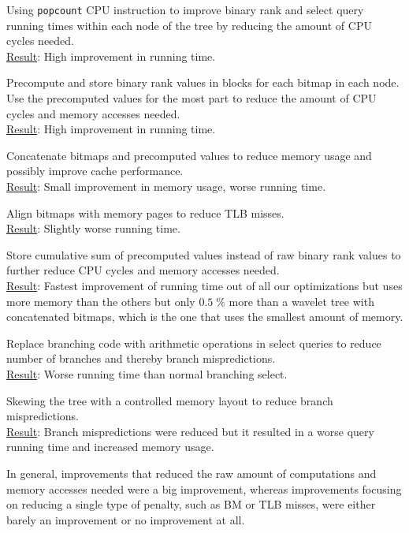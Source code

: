 \begin{description*}
\item[Using \texttt{popcount} CPU instruction] to improve binary rank and select query running times within each node of the tree by reducing the amount of CPU cycles needed.\\
\underline{Result}: High improvement in running time. 
\item[Precompute and store binary rank values] in blocks for each bitmap in each node. Use the precomputed values for the most part to reduce the amount of CPU cycles and memory accesses needed.\\ 
\underline{Result}: High improvement in running time.
\item[Concatenate bitmaps and precomputed values] to reduce memory usage and possibly improve cache performance.\\ 
\underline{Result}: Small improvement in memory usage, worse running time.
\item[Align bitmaps with memory pages] to reduce TLB misses.\\ 
\underline{Result}: Slightly worse running time.
\item[Store cumulative sum of precomputed values] instead of raw binary rank values to further reduce CPU cycles and memory accesses needed.\\
\underline{Result}: Fastest improvement of running time out of all our optimizations but uses more memory than the others but only $0.5\;\%$ more than a wavelet tree with concatenated bitmaps, which is the one that uses the smallest amount of memory.
\item[Replace branching code with arithmetic operations] in select queries to reduce number of branches and thereby branch mispredictions.\\ 
\underline{Result}: Worse running time than normal branching select.
\item[Skewing the tree] with a controlled memory layout to reduce branch mispredictions.\\ 
\underline{Result}: Branch mispredictions were reduced but it resulted in a worse query running time and increased memory usage.
\end{description*}

In general, improvements that reduced the raw amount of computations and memory accesses needed were a big improvement, whereas improvements focusing on reducing a single type of penalty, such as BM or TLB misses, were either barely an improvement or no improvement at all.